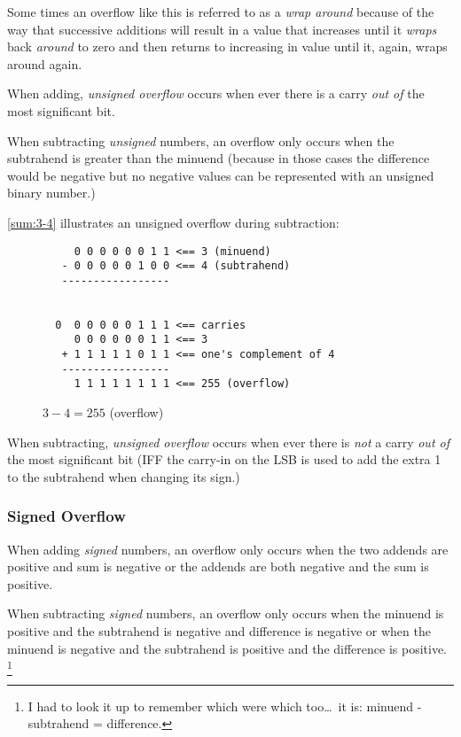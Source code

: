 Some times an overflow like this is referred to as a {\em wrap around}
because of the way that successive additions will result in a value that
increases until it {\em wraps} back {\em around} to zero and then 
returns to increasing in value until it, again, wraps around again.

\begin{tcolorbox}
When adding, {\em unsigned overflow} occurs when ever there is a carry
{\em out of} the most significant bit.
\end{tcolorbox}



When subtracting {\em unsigned} numbers, an overflow only occurs when the
subtrahend is greater than the minuend (because in those cases the 
difference would be negative but no negative values 
can be represented with an unsigned binary number.)

\autoref{sum:3-4} illustrates an unsigned overflow during subtraction:

\begin{figure}[H]
\centering
\begin{BVerbatim}
     0 0 0 0 0 0 1 1 <== 3 (minuend)
   - 0 0 0 0 0 1 0 0 <== 4 (subtrahend)
   -----------------


  0  0 0 0 0 0 1 1 1 <== carries
     0 0 0 0 0 0 1 1 <== 3
   + 1 1 1 1 1 0 1 1 <== one's complement of 4
   -----------------
     1 1 1 1 1 1 1 1 <== 255 (overflow)
\end{BVerbatim}
\caption{$3-4=255$ (overflow)}
\label{sum:3-4}
\end{figure}

\begin{tcolorbox}
When subtracting, {\em unsigned overflow} occurs when ever there is {\em not} a carry
{\em out of} the most significant bit (IFF the carry-in on the LSB is used to add the
extra 1 to the subtrahend when changing its sign.)
\end{tcolorbox}


\subsubsection{Signed Overflow}

When adding {\em signed} numbers, an overflow only occurs when the two 
addends are positive and sum is negative or the addends are both negative 
and the sum is positive.  

When subtracting {\em signed} numbers, an overflow only occurs when the
minuend is positive and the subtrahend is negative and difference is negative
or when the minuend is negative and the subtrahend is positive and the 
difference is positive.%
\footnote{I had to look it up to remember which were which 
too\ldots\ it is: minuend - subtrahend = difference.\cite{subtrahend}}

